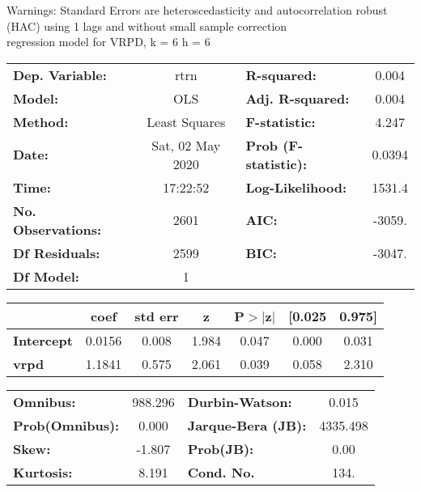 Warnings: \newline
 [1] Standard Errors are heteroscedasticity and autocorrelation robust (HAC) using 1 lags and without small sample correction\\ 

regression model for VRPD, k = 6 h = 6\begin{center}
\begin{tabular}{lclc}
\toprule
\textbf{Dep. Variable:}    &       rtrn       & \textbf{  R-squared:         } &     0.004   \\
\textbf{Model:}            &       OLS        & \textbf{  Adj. R-squared:    } &     0.004   \\
\textbf{Method:}           &  Least Squares   & \textbf{  F-statistic:       } &     4.247   \\
\textbf{Date:}             & Sat, 02 May 2020 & \textbf{  Prob (F-statistic):} &   0.0394    \\
\textbf{Time:}             &     17:22:52     & \textbf{  Log-Likelihood:    } &    1531.4   \\
\textbf{No. Observations:} &        2601      & \textbf{  AIC:               } &    -3059.   \\
\textbf{Df Residuals:}     &        2599      & \textbf{  BIC:               } &    -3047.   \\
\textbf{Df Model:}         &           1      & \textbf{                     } &             \\
\bottomrule
\end{tabular}
\begin{tabular}{lcccccc}
                   & \textbf{coef} & \textbf{std err} & \textbf{z} & \textbf{P$> |$z$|$} & \textbf{[0.025} & \textbf{0.975]}  \\
\midrule
\textbf{Intercept} &       0.0156  &        0.008     &     1.984  &         0.047        &        0.000    &        0.031     \\
\textbf{vrpd}      &       1.1841  &        0.575     &     2.061  &         0.039        &        0.058    &        2.310     \\
\bottomrule
\end{tabular}
\begin{tabular}{lclc}
\textbf{Omnibus:}       & 988.296 & \textbf{  Durbin-Watson:     } &    0.015  \\
\textbf{Prob(Omnibus):} &   0.000 & \textbf{  Jarque-Bera (JB):  } & 4335.498  \\
\textbf{Skew:}          &  -1.807 & \textbf{  Prob(JB):          } &     0.00  \\
\textbf{Kurtosis:}      &   8.191 & \textbf{  Cond. No.          } &     134.  \\
\bottomrule
\end{tabular}
\end{center}


